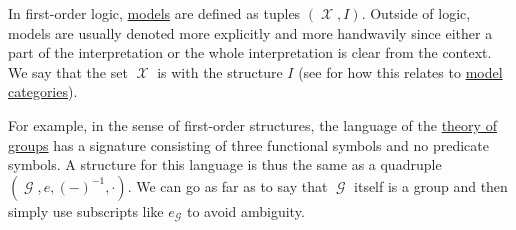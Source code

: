 \begin{remark}\label{rem:first_order_model_notation}
  In first-order logic, \hyperref[def:first_order_semantics/satisfiability]{models} are defined as tuples \( (\mscrX, I) \). Outside of logic, models are usually denoted more explicitly and more handwavily since either a part of the interpretation or the whole interpretation is clear from the context. We say that the set \( \mscrX \) is  with the structure \( I \) (see  for how this relates to \hyperref[def:concrete_category]{model categories}).

  For example, in the sense of first-order structures, the language of the \hyperref[def:group/theory]{theory of groups} has a signature consisting of three functional symbols and no predicate symbols. A structure for this language is thus the same as a quadruple \( (\mscrG, e, (-)^{-1}, \cdot) \). We can go as far as to say that \( \mscrG \) itself is a group and then simply use subscripts like \( e_{\mscrG} \) to avoid ambiguity.
\end{remark}

